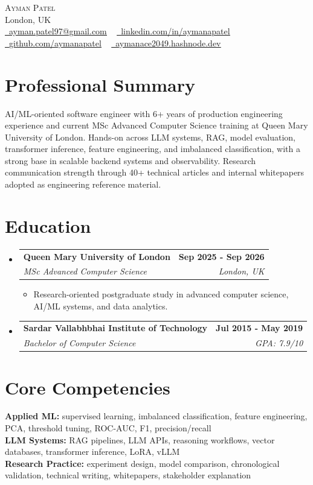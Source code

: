 \documentclass[a4paper,11pt]{article}
\makeatletter
\newcommand{\resumeItem}[1]{
  \item\small{{#1 \vspace{-3pt}}}
}
\newcommand{\resumeSubheading}[4]{
  \vspace{-3pt}\item
    \begin{tabular*}{1.0\textwidth}[t]{l@{\extracolsep{\fill}}r}
      \textbf{#1} & \textbf{\small #2} \\
      \textit{\small#3} & \textit{\small #4} \\
    \end{tabular*}\vspace{-7pt}
}
\newcommand{\resumeSubHeadingListStart}{\begin{itemize}[leftmargin=0.0in, label={}]}
\newcommand{\resumeSubHeadingListEnd}{\end{itemize}}
\newcommand{\resumeItemListStart}{\begin{itemize}}
\newcommand{\resumeItemListEnd}{\end{itemize}\vspace{0pt}}
\makeatother
\begin{document}
\begin{center}
    {\Huge\scshape Ayman Patel}
    \\ London, UK\\
    \small
    \href{mailto:ayman.patel97@gmail.com}{\raisebox{-0.2\height}\faEnvelope\ \underline{ayman.patel97@gmail.com}} ~
    \href{https://linkedin.com/in/aymanapatel}{\raisebox{-0.2\height}\faLinkedin\ \underline{linkedin.com/in/aymanapatel}} ~
    \href{https://github.com/aymanapatel}{\raisebox{-0.2\height}\faGithub\ \underline{github.com/aymanapatel}} ~
    \href{https://aymanace2049.hashnode.dev}{\raisebox{-0.2\height}\faGlobe\ \underline{aymanace2049.hashnode.dev}}
\end{center}

\section{Professional Summary}
\small{
AI/ML-oriented software engineer with 6+ years of production engineering experience and current MSc Advanced Computer Science training at Queen Mary University of London. Hands-on across LLM systems, RAG, model evaluation, transformer inference, feature engineering, and imbalanced classification, with a strong base in scalable backend systems and observability. Research communication strength through 40+ technical articles and internal whitepapers adopted as engineering reference material.
}

\section{Education}
  \resumeSubHeadingListStart
    \resumeSubheading
      {Queen Mary University of London}{Sep 2025 - Sep 2026}
      {MSc Advanced Computer Science}{London, UK}
      \resumeItemListStart
        \resumeItem{Research-oriented postgraduate study in advanced computer science, AI/ML systems, and data analytics.}
      \resumeItemListEnd
    \resumeSubheading
      {Sardar Vallabhbhai Institute of Technology}{Jul 2015 - May 2019}
      {Bachelor of Computer Science}{GPA: 7.9/10}
  \resumeSubHeadingListEnd

\section{Core Competencies}
\vspace{-7pt}
\begin{itemize}[leftmargin=0.15in, label={}]\small{\item{
\textbf{Applied ML:} supervised learning, imbalanced classification, feature engineering, PCA, threshold tuning, ROC-AUC, F1, precision/recall \\
\textbf{LLM Systems:} RAG pipelines, LLM APIs, reasoning workflows, vector databases, transformer inference, LoRA, vLLM \\
\textbf{Research Practice:} experiment design, model comparison, chronological validation, technical writing, whitepapers, stakeholder explanation
}}
\end{itemize}
\end{document}
